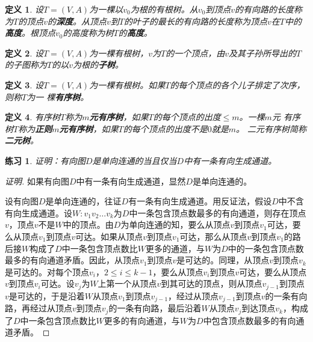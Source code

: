 \documentclass{article}
\newtheorem{Def}{定义}
\newtheorem{Exercise}{练习}
\begin{document}
\begin{CJK*}{UTF8}{gbsn}
    \begin{Def}
    设$T=(V,A)$为一棵以$v_0$为根的有根树。从$v_0$到顶点$v$的有向路的长度称为$T$的顶点$v$的{\bfseries 深度}。从顶点$v$到$T$的叶子的最长的有向路的长度称为顶点$v$在$T$中的{\bfseries 高度}。根顶点$v_0$的高度称为树$T$的{\bfseries 高度}。
  \end{Def}

    \begin{Def}
    设$T=(V,A)$为一棵有根树，$v$为$T$的一个顶点，由$v$及其子孙所导出的$T$的子图称为$T$的以$v$为根的{\bfseries 子树}。
  \end{Def}

    \begin{Def}
    设$T=(V,A)$为一棵有根树。如果$T$的每个顶点的各个儿子排定了次序，则称$T$为一
    棵{\bfseries 有序树}。
  \end{Def}

    \begin{Def}
    有序树$T$称为{\bfseries $m$元有序树}，如果$T$的每个顶点的出度$\leq m$。一棵$m$元
    有序树$T$称为{\bfseries 正则$m$元有序树}，如果$T$的每个顶点的出度不是$0$就是$m$。
    二元有序树简称{\bfseries 二元树}。
  \end{Def}

  \begin{Exercise}
    证明：有向图$D$是单向连通的当且仅当$D$中有一条有向生成通道。
  \end{Exercise}
  \begin{proof}[证明]
    如果有向图$D$中有一条有向生成通道，显然$D$是单向连通的。
  
    设有向图$D$是单向连通的，往证$D$有一条有向生成通道。用反证法，假设$D$中不含有向生成通道。设$W:v_1v_2\ldots v_k$为$D$中一条包含顶点数最多的有向通道，则存在顶点$v$，顶点$v$不是$W$中的顶点。由$D$为单向连通的知，要么从顶点$v$到顶点$v_1$可达，要么从顶点$v_1$到顶点$v$可达。如果从顶点$v$到顶点$v_1$可达，那么从顶点$v$到顶点$v_1$的路后接$W$构成了$D$中一条包含顶点数比$W$更多的通道，与$W$为$D$中的一条包含顶点数最多的有向通道矛盾。因此，从顶点$v_1$到顶点$v$是可达的。同理，从顶点$v$到顶点$v_k$是可达的。对每个顶点$v_i$，$2\leq i \leq k-1$，要么从顶点$v_i$到顶点$v$可达，要么从顶点$v$到顶点$v_i$可达。设$v_j$为$W$上第一个从顶点$v$到其可达的顶点，则从顶点$v_{j-1}$到顶点$v$是可达的，于是沿着$W$从顶点$v_1$到顶点$v_{j-1}$，经过从顶点$v_{j-1}$到顶点$v$的一条有向路，再经过从顶点$v$到顶点$v_j$的一条有向路，最后沿着$W$从顶点$v_j$到达顶点$v_k$，构成了$D$中一条包含顶点数比$W$更多的有向通道，与$W$为$D$中包含顶点数最多的有向通道矛盾。
  \end{proof}
  




\end{CJK*}
\end{document}
